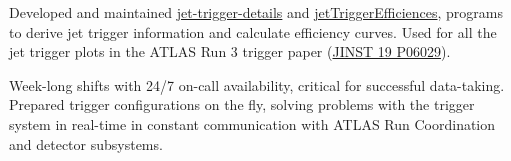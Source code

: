 
\begin{cventries}
    {Developed and maintained \href{https://gitlab.cern.ch/atlas-trigger/jet/jet-trigger-details}{jet-trigger-details} and \href{https://gitlab.cern.ch/atlas-trigger/jet/jetTriggerEfficiencies/-/tree/R22-master}{jetTriggerEfficiences}, programs to derive jet trigger information and calculate efficiency curves. Used for all the jet trigger plots in the ATLAS Run 3 trigger paper (\href{https://doi.org/10.1088/1748-0221/19/06/P06029}{JINST 19 P06029}).}

    {Week-long shifts with 24/7 on-call availability, critical for successful data-taking. Prepared trigger configurations on the fly, solving problems with the trigger system in real-time in constant communication with ATLAS Run Coordination and detector subsystems.}


\end{cventries}